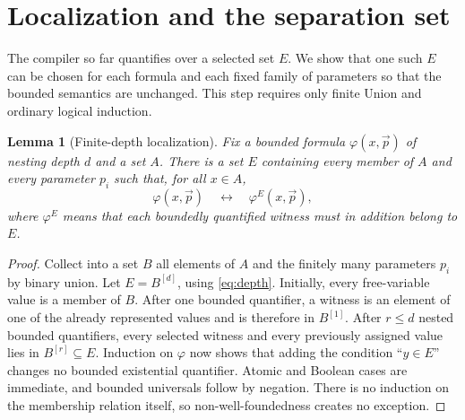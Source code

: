 \documentclass[11pt,a4paper]{article}
\numberwithin{equation}{section}
\newtheorem{lemma}[theorem]{Lemma}
\begin{document}
\section{Localization and the separation set}\label{sec:localization}
The compiler so far quantifies over a selected set $E$.  We show that one such $E$ can be chosen for each formula and each fixed family of parameters so that the bounded semantics are unchanged.  This step requires only finite Union and ordinary logical induction.

\begin{lemma}[Finite-depth localization]\label{lem:local}
Fix a bounded formula $\varphi(x,\vec p)$ of nesting depth $d$ and a set $A$.  There is a set $E$ containing every member of $A$ and every parameter $p_i$ such that, for all $x\in A$,
\[
\varphi(x,\vec p)\quad\longleftrightarrow\quad
\varphi^E(x,\vec p),
\]
where $\varphi^E$ means that each boundedly quantified witness must in addition belong to $E$.
\end{lemma}
\begin{proof}
Collect into a set $B$ all elements of $A$ and the finitely many parameters $p_i$ by binary union.  Let $E=B^{[d]}$, using \eqref{eq:depth}.  Initially, every free-variable value is a member of $B$.  After one bounded quantifier, a witness is an element of one of the already represented values and is therefore in $B^{[1]}$.  After $r\le d$ nested bounded quantifiers, every selected witness and every previously assigned value lies in $B^{[r]}\subseteq E$.  Induction on $\varphi$ now shows that adding the condition ``$y\in E$'' changes no bounded existential quantifier.  Atomic and Boolean cases are immediate, and bounded universals follow by negation.  There is no induction on the membership relation itself, so non-well-foundedness creates no exception.
\end{proof}
\end{document}
